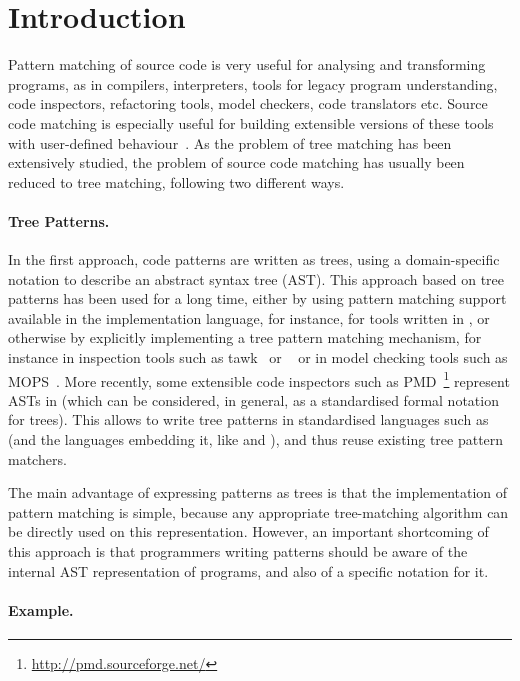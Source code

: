 
\section{Introduction}

Pattern matching of source code is very useful for analysing and
transforming programs, as in compilers, interpreters, tools for legacy
program understanding, code inspectors, refactoring tools, model
checkers, code translators etc. Source code matching is especially
useful for building extensible versions of these tools with
user\hyp{}defined behaviour~\cite{mc, mj, mops, blast}. As the problem
of tree matching has been extensively studied, the problem of source
code matching has usually been reduced to tree matching, following two
different ways.

\paragraph{Tree Patterns.}

In the first approach, code patterns are written as trees, using a
domain\hyp{}specific notation to describe an abstract syntax tree
(AST). This approach based on tree patterns has been used for a long
time, either by using pattern matching support available in the
implementation language, for instance, for tools written in \ML, or
otherwise by explicitly implementing a tree pattern matching
mechanism, for instance in inspection tools such as
\textsf{tawk}~\cite{tawk} or \Scruple~\cite{scruple} or in model
checking tools such as \textsf{MOPS}~\cite{mops}. More recently, some
extensible code inspectors such as
\textsf{PMD}~\footnote{\url{http://pmd.sourceforge.net/}} represent
ASTs in \XML (which can be considered, in general, as a standardised
formal notation for trees). This allows to write tree patterns in
standardised languages such as \XPath (and the languages embedding it,
like \XQuery and \XSLT), and thus reuse existing tree pattern
matchers.

The main advantage of expressing patterns as trees is that the
implementation of pattern matching is simple, because any appropriate
tree\hyp{}matching algorithm can be directly used on this
representation. However, an important shortcoming of this approach is
that programmers writing patterns should be aware of the internal AST
representation of programs, and also of a specific notation for it.

\paragraph{Example.}


